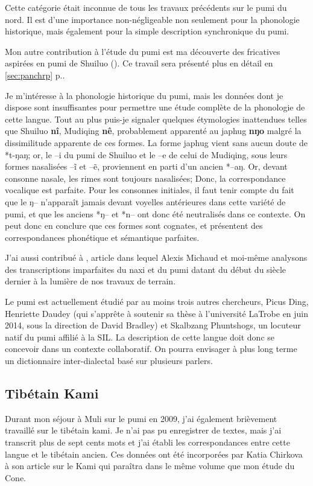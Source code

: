 \documentclass[oldfontcommands,oneside,a4paper,11pt]{memoir}
\newcommand{\ipa}[1]{{\phon\textbf{#1}}}
\begin{document}
Cette catégorie était inconnue de tous les travaux précédents sur le pumi du nord. Il est d'une importance non-négligeable non seulement pour la phonologie historique, mais également pour la simple description synchronique du pumi.

Mon autre contribution à l'étude du pumi est ma découverte des fricatives aspirées en pumi de Shuiluo (\citealt{jacques11lingua}). Ce travail sera présenté plus en détail en \ref{sec:panchrp} p.\pageref{sec:panchrp}.

Je m'intéresse à la phonologie historique du pumi, mais les données dont je dispose sont insuffisantes pour permettre une étude complète de la phonologie de cette langue. Tout au plus puis-je signaler quelques étymologies inattendues telles que Shuiluo \ipa{nî}, Mudiqing \ipa{nê}, probablement apparenté au japhug \ipa{nŋo} malgré la dissimilitude apparente de ces formes. La forme japhug vient sans aucun doute  de *t-ŋaŋ; or, le --i du pumi de Shuiluo et le --e de celui de Mudiqing, sous leurs formes nasalisées --ĩ et --ẽ, proviennent en parti d'un ancien *--aŋ. Or, devant consonne nasale, les rimes sont toujours nasalisées; Donc, la correspondance vocalique est parfaite. Pour les consonnes initiales, il faut tenir compte du fait que le ŋ-- n'apparaît jamais devant voyelles antérieures dans cette variété de pumi, et que les anciens *ŋ-- et *n-- ont donc été neutralisés dans ce contexte. On peut donc en conclure que ces formes sont cognates, et présentent des correspondances phonétique et sémantique parfaites.

J'ai aussi contribué à \citet{michaud10bonin}, article dans lequel Alexis Michaud et moi-même analysons des transcriptions imparfaites du naxi et du pumi datant du début du siècle dernier à la lumière de nos travaux de terrain.
 


Le pumi est actuellement étudié par au moins trois autres chercheurs, Picus Ding, Henriette Daudey (qui s'apprête à soutenir sa thèse à l'université LaTrobe en juin 2014, sous la direction de David Bradley) et Skalbzang Phuntshogs, un locuteur natif  du pumi affilié à la SIL. La description de cette langue doit donc se concevoir dans un contexte collaboratif. On pourra envisager à plus long terme un dictionnaire inter-dialectal basé sur plusieurs parlers. 

\subsection{Tibétain Kami}
Durant mon séjour à Muli sur le pumi en 2009, j'ai également brièvement travaillé sur le tibétain kami. Je n'ai pas pu enregistrer de textes, mais j'ai transcrit plus de sept cents mots et j'ai établi les correspondances entre cette langue et le tibétain ancien. Ces données ont été incorporées par Katia Chirkova à son article sur le Kami qui paraîtra dans le même volume que mon étude du Cone.
\end{document}
